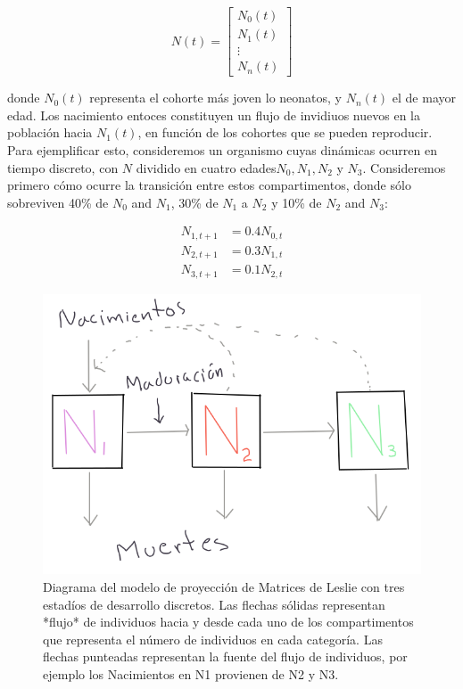 \documentclass[
]{book}
\begin{document}
\[
N(t) = \left[\begin{array}{c} N_0(t)\\ N_1(t)\\ \vdots \\ N_n(t) \end{array}\right]
\]

donde \(N_0(t)\) representa el cohorte más joven lo neonatos, y \(N_n(t)\) el de mayor edad. Los nacimiento entoces constituyen un flujo de invidiuos nuevos en la población hacia \(N_1(t)\), en función de los cohortes que se pueden reproducir. Para ejemplificar esto, consideremos un organismo cuyas dinámicas ocurren en tiempo discreto, con \(N\) dividido en cuatro edades\(N_0, N_1, N_2\) y \(N_3\). Consideremos primero cómo ocurre la transición entre estos compartimentos, donde sólo sobreviven 40\% de \(N_0\) and \(N_1\), 30\% de \(N_1\) a \(N_2\) y 10\% de \(N_2\) and \(N_3\):

\begin{align}
N_{1, t+1} &= 0.4 N_{0, t} \\
N_{2, t+1} &= 0.3 N_{1, t} \\
N_{3, t+1} &= 0.1 N_{2, t}
\end{align}

\begin{figure}

{\centering \includegraphics[width=8.89in]{Unidad-VI/Modelo-Leslie} 

}

\caption{Diagrama del modelo de proyección de Matrices de Leslie con tres estadíos de desarrollo discretos. Las flechas sólidas representan *flujo* de individuos hacia y desde cada uno de los compartimentos que representa el número de individuos en cada categoría. Las flechas punteadas representan la fuente del flujo de individuos, por ejemplo los Nacimientos en N1 provienen de N2 y N3.}\label{fig:Leslie}
\end{figure}
\end{document}
